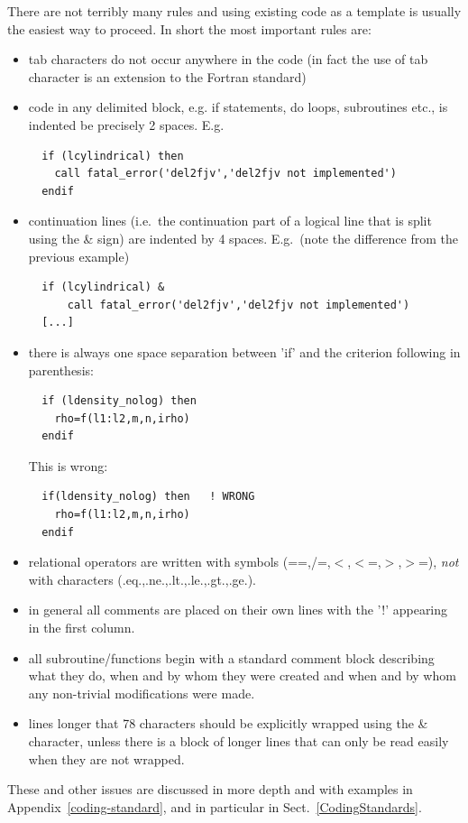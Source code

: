 \documentclass[\mydriver,12pt,twoside,notitlepage,a4paper]{article}
\begin{document}
There are not terribly many rules and using existing code as a template
is usually the easiest way to proceed.  In short the most important rules are:
\begin{itemize}
\item tab characters do not occur anywhere in the code (in fact the use of
tab character is an extension to the Fortran standard)
\item code in any delimited block, e.g. if statements, do loops, subroutines
etc., is indented be precisely 2 spaces.
E.g.
\begin{Verbatim}
  if (lcylindrical) then
    call fatal_error('del2fjv','del2fjv not implemented')
  endif
\end{Verbatim}
\item continuation lines (i.e.~the continuation part of a logical line
  that is split using the \& sign) are indented by 4 spaces.
  E.g.~(note the difference from the previous example)
\begin{Verbatim}
  if (lcylindrical) &
      call fatal_error('del2fjv','del2fjv not implemented')
  [...]
\end{Verbatim}
\item there is always one space separation between 'if' and the criterion
following in parenthesis:
\begin{verbatim}
  if (ldensity_nolog) then
    rho=f(l1:l2,m,n,irho)
  endif
\end{verbatim}
This is wrong:
\begin{verbatim}
  if(ldensity_nolog) then   ! WRONG
    rho=f(l1:l2,m,n,irho)
  endif
\end{verbatim}
\item relational operators are written with symbols (==,/=,$<$,$<$=,$>$,$>$=),
{\it not} with characters (.eq.,.ne.,.lt.,.le.,.gt.,.ge.).
\item in general all comments are placed on their own lines with the '!'
appearing in the first column.
\item all subroutine/functions begin with a standard comment block describing
what they do, when and by whom they were created and when and by whom any
non-trivial modifications were made.
\item lines longer that 78 characters should be explicitly wrapped using
  the \& character, unless there is a block of longer lines that can only
  be read easily when they are not wrapped.
\end{itemize}

These and other issues are discussed in more depth and with examples in
Appendix~\ref{coding-standard}, and in particular in Sect.~\ref{CodingStandards}.
\end{document}
